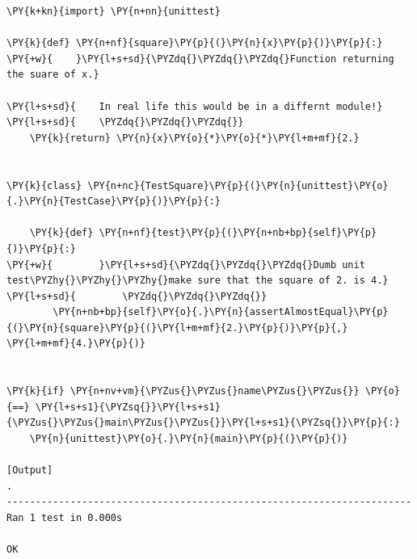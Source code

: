 \begin{Verbatim}[label=\makebox{\url{https://github.com/lucabaldini/cmepda/tree/master/slides/latex/snippets/unit\_test.py}},commandchars=\\\{\}]
\PY{k+kn}{import} \PY{n+nn}{unittest}

\PY{k}{def} \PY{n+nf}{square}\PY{p}{(}\PY{n}{x}\PY{p}{)}\PY{p}{:}
\PY{+w}{    }\PY{l+s+sd}{\PYZdq{}\PYZdq{}\PYZdq{}Function returning the suare of x.}

\PY{l+s+sd}{    In real life this would be in a differnt module!}
\PY{l+s+sd}{    \PYZdq{}\PYZdq{}\PYZdq{}}
    \PY{k}{return} \PY{n}{x}\PY{o}{*}\PY{o}{*}\PY{l+m+mf}{2.}


\PY{k}{class} \PY{n+nc}{TestSquare}\PY{p}{(}\PY{n}{unittest}\PY{o}{.}\PY{n}{TestCase}\PY{p}{)}\PY{p}{:}

    \PY{k}{def} \PY{n+nf}{test}\PY{p}{(}\PY{n+nb+bp}{self}\PY{p}{)}\PY{p}{:}
\PY{+w}{        }\PY{l+s+sd}{\PYZdq{}\PYZdq{}\PYZdq{}Dumb unit test\PYZhy{}\PYZhy{}\PYZhy{}make sure that the square of 2. is 4.}
\PY{l+s+sd}{        \PYZdq{}\PYZdq{}\PYZdq{}}
        \PY{n+nb+bp}{self}\PY{o}{.}\PY{n}{assertAlmostEqual}\PY{p}{(}\PY{n}{square}\PY{p}{(}\PY{l+m+mf}{2.}\PY{p}{)}\PY{p}{,} \PY{l+m+mf}{4.}\PY{p}{)}


\PY{k}{if} \PY{n+nv+vm}{\PYZus{}\PYZus{}name\PYZus{}\PYZus{}} \PY{o}{==} \PY{l+s+s1}{\PYZsq{}}\PY{l+s+s1}{\PYZus{}\PYZus{}main\PYZus{}\PYZus{}}\PY{l+s+s1}{\PYZsq{}}\PY{p}{:}
    \PY{n}{unittest}\PY{o}{.}\PY{n}{main}\PY{p}{(}\PY{p}{)}

[Output]
.
----------------------------------------------------------------------
Ran 1 test in 0.000s

OK
\end{Verbatim}